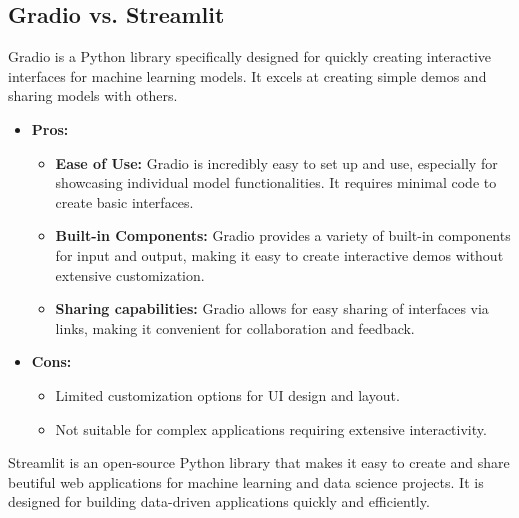 \documentclass[12pt]{report}
\begin{document}
\subsection{Gradio vs. Streamlit}
Gradio is a Python library specifically designed for quickly creating interactive interfaces for machine learning models. It excels at creating simple demos and sharing models with others.
\begin{itemize}
    \item \textbf{Pros:}
        \begin{itemize}
            \item \textbf{Ease of Use:} Gradio is incredibly easy to set up and use, especially for showcasing individual model functionalities. It requires minimal code to create basic interfaces.
            \item \textbf{Built-in Components:} Gradio provides a variety of built-in components for input and output, making it easy to create interactive demos without extensive customization.
            \item \textbf{Sharing capabilities:} Gradio allows for easy sharing of interfaces via links, making it convenient for collaboration and feedback.
        \end{itemize}
    \item \textbf{Cons:}
        \begin{itemize}
            \item Limited customization options for UI design and layout.
            \item Not suitable for complex applications requiring extensive interactivity.
        \end{itemize}
\end{itemize}
Streamlit is an open-source Python library that makes it easy to create and share beutiful web applications for machine learning and data science projects. It is designed for building data-driven applications quickly and efficiently.
\end{document}
